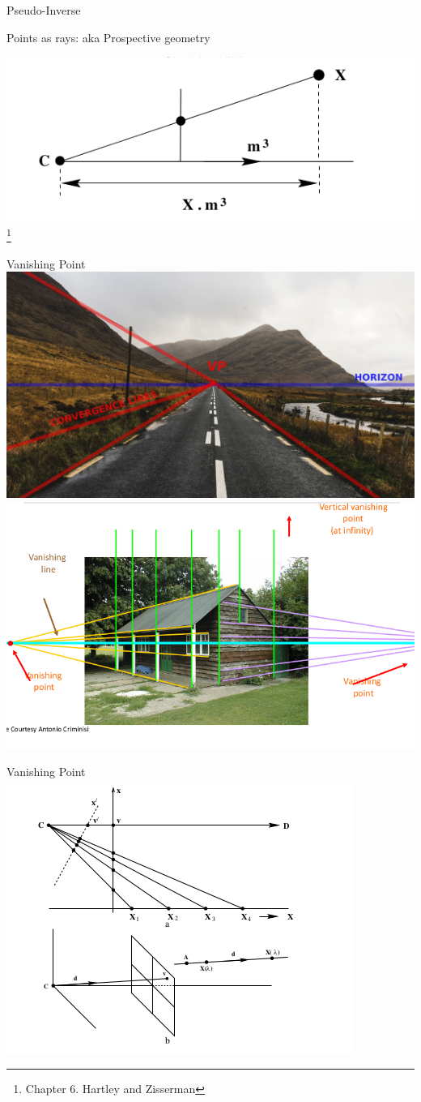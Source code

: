 \documentclass{beamer}
\begin{document}
  \begin{frame}{Pseudo-Inverse}

  \end{frame}

  \begin{frame}{Points as rays: aka Prospective geometry}
  \end{frame}

  \begin{frame}
    \includegraphics[width=0.4\linewidth]{media/recovering-ray-from-point.png}
    \footnote{Chapter 6. Hartley and Zisserman}
  \end{frame}

  \begin{frame}{Vanishing Point}
    \includegraphics[width=0.7\linewidth]{media/vanishing-lines.jpeg}
    \\
    \includegraphics[width=0.7\linewidth]{media/vanishing-points.png}
  \end{frame}

  \begin{frame}{Vanishing Point}
    \includegraphics[width=0.5\linewidth]{media/vanishing-point-formation.png}
  \end{frame}
\end{document}
